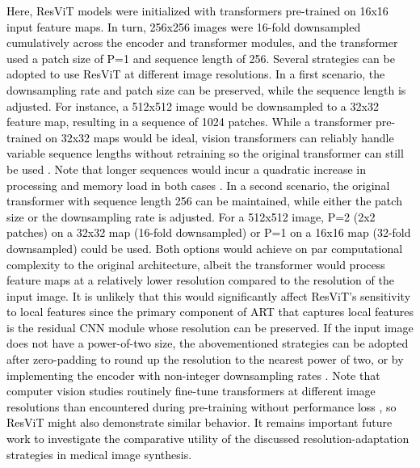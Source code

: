 \documentclass[journal,twoside,web]{ieeecolor}
\newcommand*{\revhl}{\textcolor{black}}
\begin{document}
\par
\revhl{Here, ResViT models were initialized with transformers pre-trained on 16x16 input feature maps. In turn, 256x256 images were 16-fold downsampled cumulatively across the encoder and transformer modules, and the transformer used a patch size of P=1 and sequence length of 256. Several strategies can be adopted to use ResViT at different image resolutions. In a first scenario, the downsampling rate and patch size can be preserved, while the sequence length is adjusted. For instance, a 512x512 image would be downsampled to a 32x32 feature map, resulting in a sequence of 1024 patches. While a transformer pre-trained on 32x32 maps would be ideal, vision transformers can reliably handle variable sequence lengths without retraining so the original transformer can still be used \cite{vit}. Note that longer sequences would incur a quadratic increase in processing and memory load in both cases \cite{vit}. In a second scenario, the original transformer with sequence length 256 can be maintained, while either the patch size or the downsampling rate is adjusted. For a 512x512 image, P=2 (2x2 patches) on a 32x32 map (16-fold downsampled) or P=1 on a 16x16 map (32-fold downsampled) could be used. Both options would achieve on par computational complexity to the original architecture, albeit the transformer would process feature maps at a relatively lower resolution compared to the resolution of the input image. It is unlikely that this would significantly affect ResViT’s sensitivity to local features since the primary component of ART that captures local features is the residual CNN module whose resolution can be preserved. If the input image does not have a power-of-two size, the abovementioned strategies can be adopted after zero-padding to round up the resolution to the nearest power of two, or by implementing the encoder with non-integer downsampling rates \cite{chen2021convolutional}. Note that computer vision studies routinely fine-tune transformers at different image resolutions than encountered during pre-training without performance loss \cite{vit}, so ResViT might also demonstrate similar behavior. It remains important future work to investigate the comparative utility of the discussed resolution-adaptation strategies in medical image synthesis.}
\end{document}
